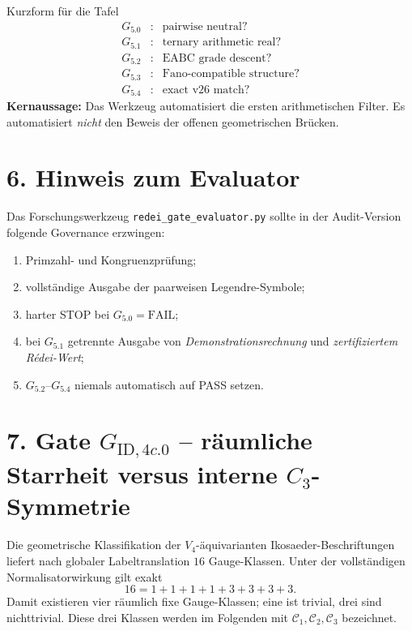 \documentclass[11pt,a4paper]{article}
\begin{document}
\begin{statusbox}{Kurzform für die Tafel}
\[
\boxed{
\begin{array}{rcl}
G_{5.0}&:&\text{pairwise neutral?}\\
G_{5.1}&:&\text{ternary arithmetic real?}\\
G_{5.2}&:&\text{EABC grade descent?}\\
G_{5.3}&:&\text{Fano-compatible structure?}\\
G_{5.4}&:&\text{exact v26 match?}
\end{array}}
\]
\textbf{Kernaussage:} Das Werkzeug automatisiert die ersten arithmetischen Filter. Es automatisiert \emph{nicht} den Beweis der offenen geometrischen Brücken.
\end{statusbox}

\section*{6. Hinweis zum Evaluator}

Das Forschungswerkzeug \texttt{redei\_gate\_evaluator.py} sollte in der Audit-Version folgende Governance erzwingen:
\begin{enumerate}
\item Primzahl- und Kongruenzprüfung;
\item vollständige Ausgabe der paarweisen Legendre-Symbole;
\item harter STOP bei $G_{5.0}=\mathrm{FAIL}$;
\item bei $G_{5.1}$ getrennte Ausgabe von \emph{Demonstrationsrechnung} und \emph{zertifiziertem Rédei-Wert};
\item $G_{5.2}$--$G_{5.4}$ niemals automatisch auf PASS setzen.
\end{enumerate}


\newpage
\section*{7. Gate $G_{\mathrm{ID},4c.0}$ -- räumliche Starrheit versus interne $C_3$-Symmetrie}

Die geometrische Klassifikation der $V_4$-äquivarianten Ikosaeder-Beschriftungen liefert nach globaler Labeltranslation $16$ Gauge-Klassen. Unter der vollständigen Normalisatorwirkung gilt exakt
\[
16=1+1+1+1+3+3+3+3.
\]
Damit existieren vier räumlich fixe Gauge-Klassen; eine ist trivial, drei sind nichttrivial. Diese drei Klassen werden im Folgenden mit $\mathcal C_1,\mathcal C_2,\mathcal C_3$ bezeichnet.
\end{document}
